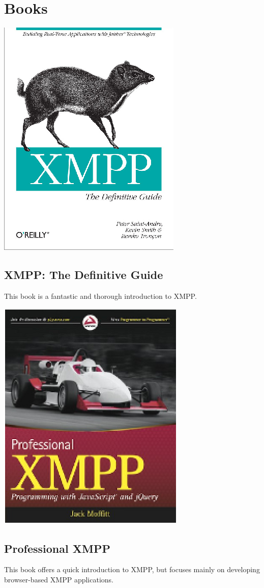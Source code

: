 \newpage

\section{Books}

\begin{multicols}{2}
\includegraphics{xmpp-the-definitive-guide.eps}

\subsection*{XMPP: The Definitive Guide}
This book is a fantastic and thorough introduction to XMPP.

\includegraphics{professional-xmpp.eps}

\subsection*{Professional XMPP}
This book offers a quick introduction to XMPP, but focuses mainly on developing browser-based XMPP applications.
\end{multicols}
